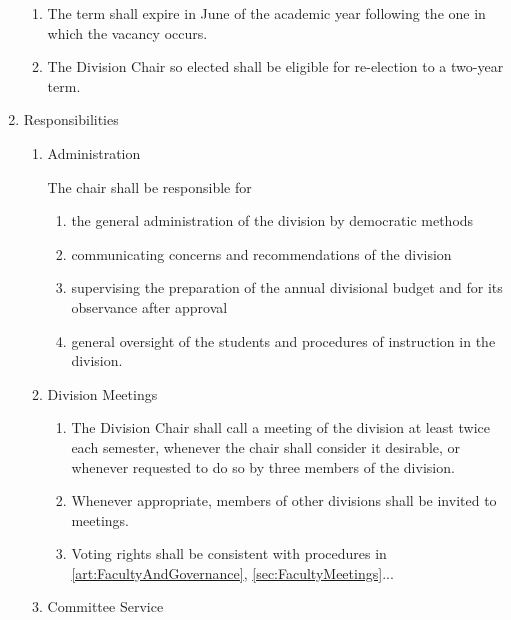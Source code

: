 \documentclass{manual}
\newcommand{\itemLevelA}{\alph*.}
\newcommand{\itemLevelB}{\arabic*)}
\newcommand{\itemLevelC}{\alph*)}
\newcommand{\itemRefA}{\alph*}
\newcommand{\itemRefB}{\arabic*}
\newcommand{\itemRefC}{\alph*}
\begin{document}
\begin{enumerate}[label=\itemLevelA,ref=\itemRefA]
\begin{enumerate}[label=\itemLevelB,ref=\itemRefB]
\item The term shall expire in June of the academic year following the one in which the vacancy occurs.

\item The Division Chair so elected shall be eligible for re-election to a two-year term. 
\end{enumerate}


\item \label{item:responsibilities01} Responsibilities
\begin{enumerate}[label=\itemLevelB,ref=\itemRefB]

\item Administration

The chair shall be responsible for
\begin{enumerate}[label=\itemLevelC,ref=\itemRefC]

\item the general administration of the division by democratic methods

\item communicating concerns and recommendations of the division

\item supervising the preparation of the annual divisional budget and for its observance after approval

\item general oversight of the students and procedures of instruction in the division.
\end{enumerate}


\item Division Meetings
\begin{enumerate}[label=\itemLevelC,ref=\itemRefC]

\item The Division Chair shall call a meeting of the division at least twice each semester, whenever the chair shall consider it desirable, or whenever requested to do so by three members of the division.

\item Whenever appropriate, members of other divisions shall be invited to meetings.

\item Voting rights shall be consistent with procedures in \cref{art:FacultyAndGovernance}, \cref{sec:FacultyMeetings}...
\end{enumerate}


\item Committee Service


\end{enumerate}
\end{enumerate}
\end{document}

